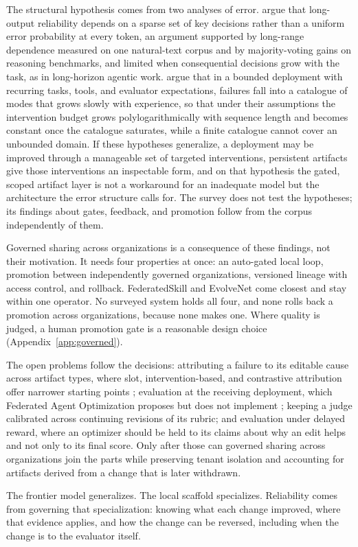The structural hypothesis comes from two analyses of error. \citet{arbuzov2025beyond} argue that long-output reliability depends on a sparse set of key decisions rather than a uniform error probability at every token, an argument supported by long-range dependence measured on one natural-text corpus and by majority-voting gains on reasoning benchmarks, and limited when consequential decisions grow with the task, as in long-horizon agentic work. \citet{arbuzov2026architecture} argue that in a bounded deployment with recurring tasks, tools, and evaluator expectations, failures fall into a catalogue of modes that grows slowly with experience, so that under their assumptions the intervention budget grows polylogarithmically with sequence length and becomes constant once the catalogue saturates, while a finite catalogue cannot cover an unbounded domain. If these hypotheses generalize, a deployment may be improved through a manageable set of targeted interventions, persistent artifacts give those interventions an inspectable form, and on that hypothesis the gated, scoped artifact layer is not a workaround for an inadequate model but the architecture the error structure calls for. The survey does not test the hypotheses; its findings about gates, feedback, and promotion follow from the corpus independently of them.

Governed sharing across organizations is a consequence of these findings, not their motivation. It needs four properties at once: an auto-gated local loop, promotion between independently governed organizations, versioned lineage with access control, and rollback. FederatedSkill and EvolveNet come closest and stay within one operator. No surveyed system holds all four, and none rolls back a promotion across organizations, because none makes one. Where quality is judged, a human promotion gate is a reasonable design choice (Appendix~\ref{app:governed}).

The open problems follow the decisions: attributing a failure to its editable cause across artifact types, where slot, intervention-based, and contrastive attribution offer narrower starting points \citep{nguyen2026harnessevo, chu2026agentgrad, zehle2026cantante}; evaluation at the receiving deployment, which Federated Agent Optimization proposes but does not implement \citep{yang2026fao}; keeping a judge calibrated across continuing revisions of its rubric; and evaluation under delayed reward, where an optimizer should be held to its claims about why an edit helps and not only to its final score. Only after those can governed sharing across organizations join the parts while preserving tenant isolation and accounting for artifacts derived from a change that is later withdrawn.

The frontier model generalizes. The local scaffold specializes. Reliability comes from governing that specialization: knowing what each change improved, where that evidence applies, and how the change can be reversed, including when the change is to the evaluator itself.
